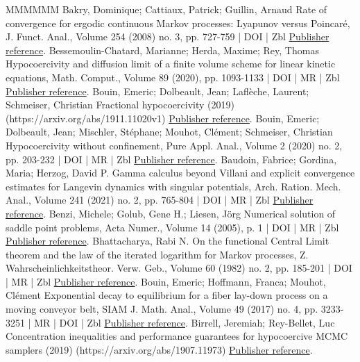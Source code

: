 \documentclass[10pt,a4paper]{article}
\numberwithin{equation}{section}
\begin{document}
\begin{thebibliography}{MMMMMM}
 Bakry, Dominique; Cattiaux, Patrick; Guillin, Arnaud Rate of convergence for ergodic continuous Markov processes: Lyapunov versus Poincaré, J. Funct. Anal., Volume 254 (2008) no. 3, pp. 727-759 | DOI | Zbl \href{https://ahl.centre-mersenne.org/item/AHL_2022__5__523_0/#BCG08}{Publisher reference}.
 Bessemoulin-Chatard, Marianne; Herda, Maxime; Rey, Thomas Hypocoercivity and diffusion limit of a finite volume scheme for linear kinetic equations, Math. Comput., Volume 89 (2020), pp. 1093-1133 | DOI | MR | Zbl \href{https://ahl.centre-mersenne.org/item/AHL_2022__5__523_0/#BCHR19}{Publisher reference}.
 Bouin, Emeric; Dolbeault, Jean; Laflèche, Laurent; Schmeiser, Christian Fractional hypocoercivity (2019) (https://arxiv.org/abs/1911.11020v1) \href{https://ahl.centre-mersenne.org/item/AHL_2022__5__523_0/#BDLS19}{Publisher reference}.
 Bouin, Emeric; Dolbeault, Jean; Mischler, Stéphane; Mouhot, Clément; Schmeiser, Christian Hypocoercivity without confinement, Pure Appl. Anal., Volume 2 (2020) no. 2, pp. 203-232 | DOI | MR | Zbl \href{https://ahl.centre-mersenne.org/item/AHL_2022__5__523_0/#BDMMS17}{Publisher reference}.
 Baudoin, Fabrice; Gordina, Maria; Herzog, David P. Gamma calculus beyond Villani and explicit convergence estimates for Langevin dynamics with singular potentials, Arch. Ration. Mech. Anal., Volume 241 (2021) no. 2, pp. 765-804 | DOI | MR | Zbl \href{https://ahl.centre-mersenne.org/item/AHL_2022__5__523_0/#BGH19}{Publisher reference}.
 Benzi, Michele; Golub, Gene H.; Liesen, Jörg Numerical solution of saddle point problems, Acta Numer., Volume 14 (2005), p. 1 | DOI | MR | Zbl \href{https://ahl.centre-mersenne.org/item/AHL_2022__5__523_0/#benzi2005numerical}{Publisher reference}.
 Bhattacharya, Rabi N. On the functional Central Limit theorem and the law of the iterated logarithm for Markov processes, Z. Wahrscheinlichkeitstheor. Verw. Geb., Volume 60 (1982) no. 2, pp. 185-201 | DOI | MR | Zbl \href{https://ahl.centre-mersenne.org/item/AHL_2022__5__523_0/#Bhattacharya}{Publisher reference}.
 Bouin, Emeric; Hoffmann, Franca; Mouhot, Clément Exponential decay to equilibrium for a fiber lay-down process on a moving conveyor belt, SIAM J. Math. Anal., Volume 49 (2017) no. 4, pp. 3233-3251 | MR | DOI | Zbl \href{https://ahl.centre-mersenne.org/item/AHL_2022__5__523_0/#BHM17}{Publisher reference}.
 Birrell, Jeremiah; Rey-Bellet, Luc Concentration inequalities and performance guarantees for hypocoercive MCMC samplers (2019) (https://arxiv.org/abs/1907.11973) \href{https://ahl.centre-mersenne.org/item/AHL_2022__5__523_0/#BRB19}{Publisher reference}.

\end{thebibliography}
\end{document}
